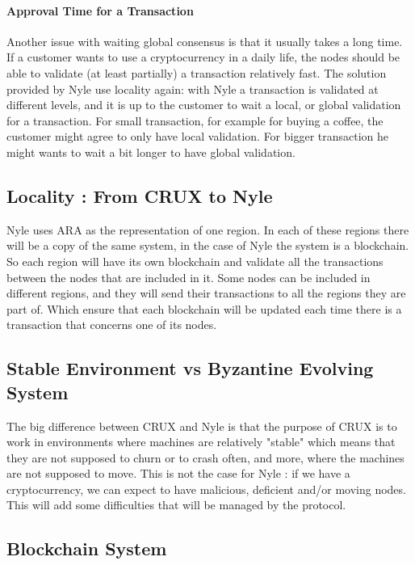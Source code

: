 \documentclass[a4paper,11pt,oneside]{report}
\begin{document}
\paragraph{Approval Time for a Transaction} \label{approve_time} Another issue
with waiting global consensus is that it usually takes a long time. If a
customer wants to use a cryptocurrency in a daily life, the nodes should be 
able to validate (at least partially) a transaction relatively fast. The
solution provided by Nyle use locality again: with Nyle a transaction is
validated at different levels, and it is up to the customer to wait a local, or
global validation for a transaction. For small transaction, for example for
buying a coffee, the customer might agree to only have local validation. For
bigger transaction he might wants to wait a bit longer to have global
validation.

\subsection{Locality : From CRUX to Nyle} Nyle uses ARA as the representation
of one region. In each of these regions there will be a copy of the same
system, in the case of Nyle the system is a blockchain. So each region will
have its own blockchain and validate all the transactions between the nodes
that are included in it. Some nodes can be included in different regions, and
they will send their transactions to all the regions they are part of. Which
ensure that each blockchain will be updated each time there is a transaction
that concerns one of its nodes.

\subsection{Stable Environment vs Byzantine Evolving System}

The big difference between CRUX \cite{Basescu2014} and Nyle is that the purpose
of CRUX \cite{Basescu2014} is to work in environments where machines are
relatively "stable" which means that they are not supposed to churn or to crash
often, and more, where the machines are not supposed to move. This is not the
case for Nyle : if we have a cryptocurrency, we can expect to have malicious,
deficient and/or moving nodes.  This will add some difficulties that will be
managed by the protocol.

\subsection{Blockchain System} \label{blockchain_subsection}
\end{document}
